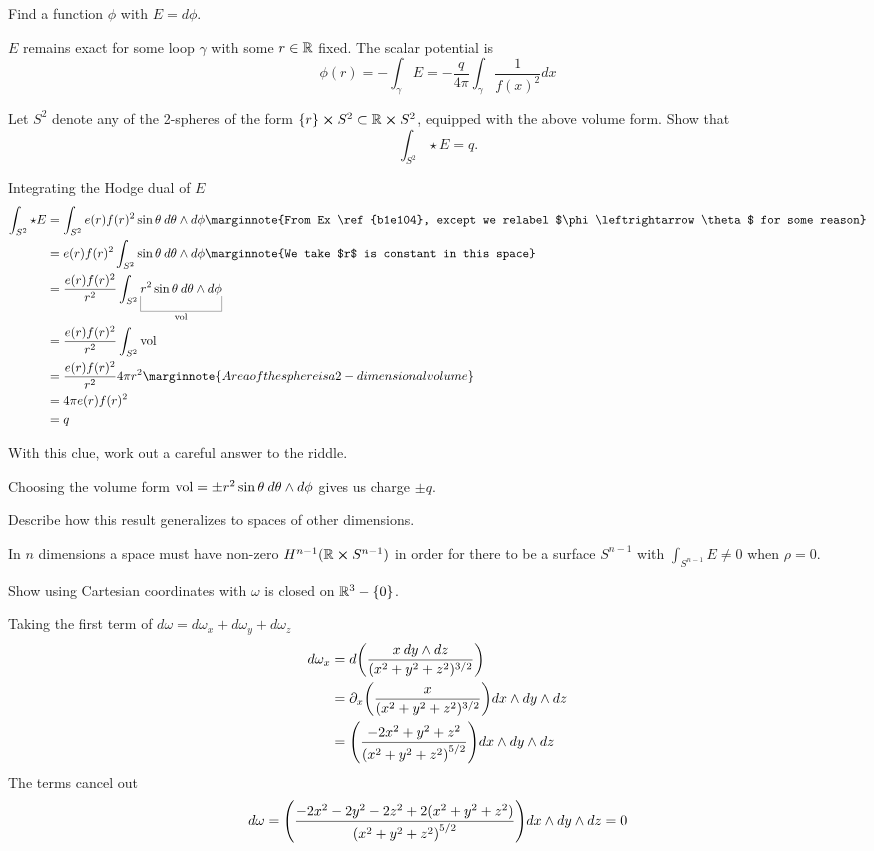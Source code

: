 \documentclass[10pt]{article}
\begin{document}
\begin{example}
	Find a function $\phi$ with $E=d\phi$.
\end{example}
\sol $E$ remains exact for some loop $\gamma$ with some $r \in \mathbb{R}$ fixed. The scalar potential is
$$
\phi(r) = -\int_\gamma E = -\frac{q}{4\pi} \int_\gamma \frac{1}{f(x)^2} dx
$$


\begin{example}
	Let $S^2$ denote any of the 2-spheres of the form $\lbrace r\rbrace \cross S^2 \subset \mathbb{R} \cross S^2$, equipped with the above volume form. Show that
	$$
		\int_{S^2} \star E = q.
	$$
\end{example}
\sol Integrating the Hodge dual of $E$
$$
\begin{aligned}
	\int_{S^2} \star E &= \int_{S^2} e(r) f(r)^2 \sin\theta\:d\theta \wedge d\phi\marginnote{From Ex \ref{b1e104}, except we relabel $\phi \leftrightarrow \theta$ for some reason}\\
	&= e(r) f(r)^2 \int_{S^2} \sin\theta\:d\theta \wedge d\phi\marginnote{We take $r$ is constant in this space}\\
	&= \frac{e(r) f(r)^2}{r^2} \int_{S^2} \ub{r^2\sin\theta\:d\theta \wedge d\phi}{\vol}\\
	&= \frac{e(r) f(r)^2}{r^2} \int_{S^2} \vol\\
	&= \frac{e(r) f(r)^2}{r^2} 4\pi r^2\marginnote{Area of the sphere is a 2-dimensional volume}\\
	&= 4\pi e(r) f(r)^2\\
	&= q
\end{aligned}
$$


\begin{example}
	With this clue, work out a careful answer to the riddle.
\end{example}
\sol Choosing the volume form $\text{vol} = \pm r^2\sin\theta\:d\theta \wedge d\phi$ gives us charge $\pm q$.


\begin{example}
	Describe how this result generalizes to spaces of other dimensions.
\end{example}
\sol In $n$ dimensions a space must have non-zero $H^{n-1}(\mathbb{R} \cross S^{n-1})$ in order for there to be a surface $S^{n-1}$ with $\int_{S^{n-1}} E \ne 0$ when $\rho = 0$.


\begin{example}
	Show using Cartesian coordinates with $\omega$ is closed on $\mathbb{R}^3 - \lbrace0\rbrace$.
\end{example}
\sol Taking the first term of $d\omega = d\omega_x + d\omega_y + d\omega_z$
$$
\begin{aligned}
	d\omega_x &= d\p*{\frac{x\:dy\wedge dz}{(x^2+y^2+z^2)^{3/2}}}\\
	&= \partial_x\p*{\frac{x}{(x^2+y^2+z^2)^{3/2}}}dx\wedge dy\wedge dz\\
	&= \p*{\frac{-2 x^2+y^2+z^2}{\left(x^2+y^2+z^2\right)^{5/2}}}dx\wedge dy\wedge dz\\
\end{aligned}
$$
The terms cancel out
$$
d\omega = \p*{\frac{-2x^2-2y^2-2z^2+2 (x^2+y^2+z^2)}{\left(x^2+y^2+z^2\right)^{5/2}}}dx\wedge dy\wedge dz = 0
$$
\end{document}
